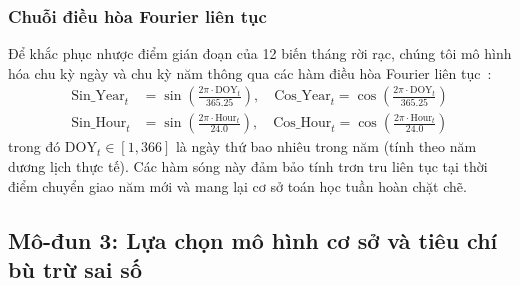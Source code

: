 \subsubsection{Chuỗi điều hòa Fourier liên tục}
\label{subsubsec:fourier}

Để khắc phục nhược điểm gián đoạn của 12 biến tháng rời rạc, chúng tôi mô hình hóa chu kỳ ngày và chu kỳ năm thông qua các hàm điều hòa Fourier liên tục~\cite{cleveland1990stl, hyndman2018forecasting}:
\begin{align}
    \text{Sin\_Year}_t &= \sin\left(\frac{2\pi \cdot \text{DOY}_t}{365.25}\right), \quad \text{Cos\_Year}_t = \cos\left(\frac{2\pi \cdot \text{DOY}_t}{365.25}\right) \\
    \text{Sin\_Hour}_t &= \sin\left(\frac{2\pi \cdot \text{Hour}_t}{24.0}\right), \quad \text{Cos\_Hour}_t = \cos\left(\frac{2\pi \cdot \text{Hour}_t}{24.0}\right)
\end{align}
trong đó $\text{DOY}_t \in [1, 366]$ là ngày thứ bao nhiêu trong năm (tính theo năm dương lịch thực tế). Các hàm sóng này đảm bảo tính trơn tru liên tục tại thời điểm chuyển giao năm mới và mang lại cơ sở toán học tuần hoàn chặt chẽ.

\subsection{Mô-đun 3: Lựa chọn mô hình cơ sở và tiêu chí bù trừ sai số}
\label{subsec:module3}

